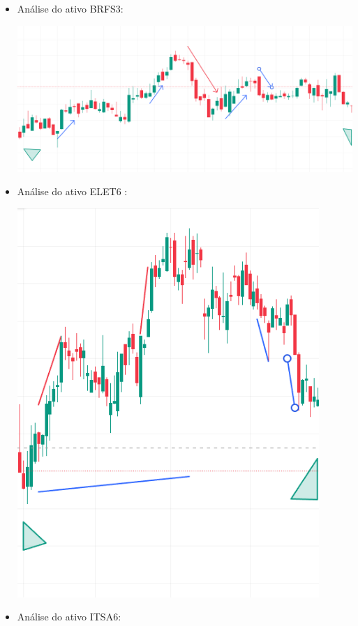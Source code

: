 \documentclass[
  letterpaper,
  DIV=11,
  numbers=noendperiod]{scrartcl}
\begin{document}
\begin{itemize}
\item
  Análise do ativo BRFS3:

  \includegraphics[width=6.35417in,height=\textheight,keepaspectratio]{images/dow2_brfs3.PNG}
\item
  Análise do ativo ELET6 :

  \includegraphics[width=4.5in,height=\textheight,keepaspectratio]{images/dow2_elet6.PNG}
\item
  Análise do ativo ITSA6:


\end{itemize}
\end{document}
